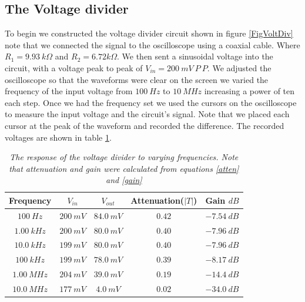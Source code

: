 \documentclass[11pt]{article}
\numberwithin{equation}{section}
\numberwithin{figure}{section}
\numberwithin{table}{section}
\begin{document}
\subsection{The Voltage divider}
To begin we constructed the voltage divider circuit shown in figure \ref{FigVoltDiv} note that we connected the signal to the oscilloscope using a coaxial cable. Where $R_1=9.93\ k\Omega$ and $R_2=6.72 k\Omega$. We then sent a sinusoidal voltage into the circuit, with a voltage peak to peak of $V_{in} = 200\ mV\ P\ P$. We adjusted the oscilloscope so that the waveforms were clear on the screen we varied the frequency of the input voltage from $100\ Hz$ to $10\ MHz$ increasing a power of ten each step. Once we had the frequency set we used the cursors on the oscilloscope to measure the input voltage and the circuit's signal. Note that we placed each cursor at the peak of the waveform and recorded the difference. The recorded voltages are shown in table \ref{VoltDiv}.
\begin{table}[h]
\centering
\begin{tabular}{ccccc}
Frequency	&$V_{in}$	&$V_{out}$	&Attenuation($|T|$)	&Gain $dB$\\
\hline
$100\ Hz$	&$200\ mV$	&$84.0\ mV$	&$0.42$		&$-7.54\ dB$\\
$1.00\ kHz$	&$200\ mV$	&$80.0\ mV$	&$0.40$		&$-7.96\ dB$\\
$10.0\ kHz$	&$199\ mV$	&$80.0\ mV$	&$0.40$		&$-7.96\ dB$\\
$100\ kHz$	&$199\ mV$	&$78.0\ mV$	&$0.39$		&$-8.17\ dB$\\
$1.00\ MHz$	&$204\ mV$	&$39.0\ mV$	&$0.19$		&$-14.4\ dB$\\
$10.0\ MHz$	&$177\ mV$	&$4.0\ mV$	&$0.02$		&$-34.0\ dB$\\
\end{tabular}
\caption{\textit{The response of the voltage divider to varying frequencies. Note that attenuation and gain were calculated from equations \ref{atten} and \ref{gain}}}
\label{VoltDiv}
\end{table}
\end{document}
